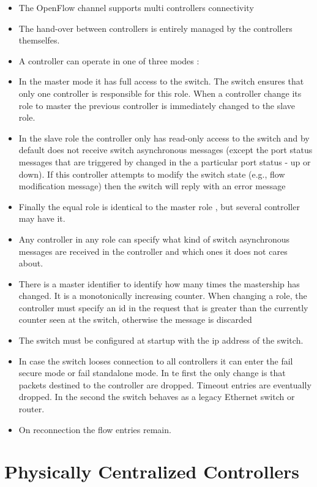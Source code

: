 \documentclass[12pt,openright,twoside]{report}
\begin{document}
\begin{itemize}
\begin{itemize}
\item The OpenFlow channel supports multi controllers connectivity
\item The hand-over between controllers is entirely managed by the controllers themselfes.
\item A controller can operate in one of three modes : 
\item In the master mode it has full access to the switch. The switch ensures that only one controller is responsible for this role.  When a controller change its role to master the previous controller is immediately changed to the slave role. 
\item In the slave role the controller only has read-only access to the switch and by default does not receive switch asynchronous messages (except the port status messages that are triggered by changed in the a particular port status - up or down). If this controller attempts to modify the switch state (e.g., flow  modification message) then the switch will reply with an error message
\item Finally the equal role is identical to the master role , but several controller may have it. 
\item Any controller in any role can specify what kind of switch asynchronous messages are received in the controller and which ones it does not cares about. 
\item There is a master identifier to identify how many times the mastership has changed. It is a monotonically increasing counter. When changing a role, the controller must specify an id in the request that is greater than the currently counter seen at the switch, otherwise the message is discarded

\item The switch must be configured at startup with the ip address of the switch. 
\item In case the switch looses connection to all controllers it can enter the fail secure mode or fail standalone mode. In te first the only change is that packets destined to the controller are dropped. Timeout entries are eventually dropped. In the second the switch behaves as a legacy Ethernet switch or router. 
\item On reconnection the flow entries remain. 

\end{itemize}
\section{Physically Centralized  Controllers}
\glsresetall
\label{sec:background:centralized}



\end{itemize}
\end{document}

